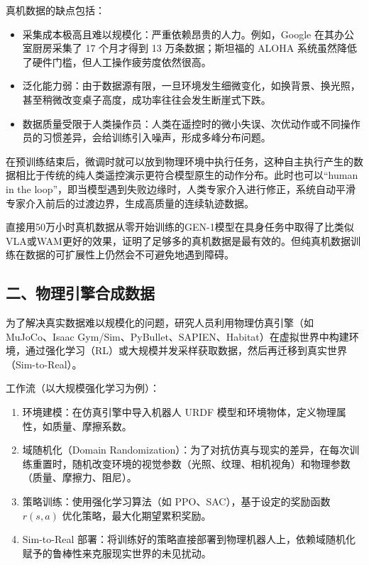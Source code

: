 真机数据的缺点包括：

\begin{itemize}
\tightlist
\item
  采集成本极高且难以规模化：严重依赖昂贵的人力。例如，Google 在其办公室厨房采集了 17 个月才得到 13 万条数据；斯坦福的 ALOHA 系统虽然降低了硬件门槛，但人工操作疲劳度依然很高。
\item
  泛化能力弱：由于数据源有限，一旦环境发生细微变化，如换背景、换光照，甚至稍微改变桌子高度，成功率往往会发生断崖式下跌。
\item
  数据质量受限于人类操作员：人类在遥控时的微小失误、次优动作或不同操作员的习惯差异，会给训练引入噪声，形成多峰分布问题。
\end{itemize}

在预训练结束后，微调时就可以放到物理环境中执行任务，这种自主执行产生的数据相比于传统的纯人类遥控演示更符合模型原生的动作分布。此时也可以``human in the loop''，即当模型遇到失败边缘时，人类专家介入进行修正，系统自动平滑专家介入前后的过渡边界，生成高质量的连续轨迹数据。

直接用50万小时真机数据从零开始训练的GEN-1模型在具身任务中取得了比类似VLA或WAM更好的效果，证明了足够多的真机数据是最有效的。但纯真机数据训练在数据的可扩展性上仍然会不可避免地遇到障碍。

\hypertarget{ux4e8cux7269ux7406ux5f15ux64ceux5408ux6210ux6570ux636e}{%
\subsection{二、物理引擎合成数据}\label{ux4e8cux7269ux7406ux5f15ux64ceux5408ux6210ux6570ux636e}}

为了解决真实数据难以规模化的问题，研究人员利用物理仿真引擎（如 MuJoCo、Isaac Gym/Sim、PyBullet、SAPIEN、Habitat）在虚拟世界中构建环境，通过强化学习（RL）或大规模并发采样获取数据，然后再迁移到真实世界（Sim-to-Real）。

工作流（以大规模强化学习为例）：

\begin{enumerate}
\def\labelenumi{\arabic{enumi}.}
\tightlist
\item
  环境建模：在仿真引擎中导入机器人 URDF 模型和环境物体，定义物理属性，如质量、摩擦系数。
\item
  域随机化（Domain Randomization）：为了对抗仿真与现实的差异，在每次训练重置时，随机改变环境的视觉参数（光照、纹理、相机视角）和物理参数（质量、摩擦力、阻尼）。
\item
  策略训练：使用强化学习算法（如 PPO、SAC），基于设定的奖励函数 \(r(s,a)\) 优化策略，最大化期望累积奖励。
\item
  Sim-to-Real 部署：将训练好的策略直接部署到物理机器人上，依赖域随机化赋予的鲁棒性来克服现实世界的未见扰动。
\end{enumerate}

